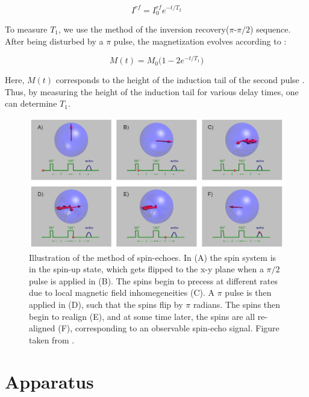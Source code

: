 \documentclass[a4paper, 12pt]{article}  %
\begin{document}
\begin{equation}\label{T2}
    I^{rf} = I_0^{rf} e^{-t/T_2}
\end{equation}


To measure $T_1$, we use the method of the inversion recovery($\pi$-$\pi/2$) sequence. After being disturbed by a $\pi$ pulse, the magnetization evolves according to \cite{Lab Manual}:

\begin{equation}\label{T1}
    M(t) = M_0 \big ( 1 - 2 e^{-t/T_1} \big )
\end{equation}

Here, $M(t)$ corresponds to the height of the induction tail of the second pulse \cite{Lab Manual}. Thus, by measuring the height of the induction tail for various delay times, one can determine $T_1$.



\begin{figure}[htb]
    \centering
    \includegraphics[width = \textwidth]{spin_echoes.PNG}
    \caption{Illustration of the method of spin-echoes. In (A) the spin system is in the spin-up state, which gets flipped to the x-y plane when a $\pi/2$ pulse is applied in (B). The spins begin to precess at different rates due to local magnetic field inhomegeneities (C). A $\pi$ pulse is then applied in (D), such that the spins flip by $\pi$ radians. The spins then begin to realign (E), and at some time later, the spins are all re-aligned (F), corresponding to an observable spin-echo signal. Figure taken from \cite{Spin Echo}.}
    \label{fig:spin_echo}
\end{figure}




\section{Apparatus}
\end{document}
